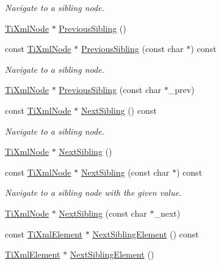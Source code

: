 \begin{DoxyCompactItemize}
\begin{DoxyCompactList}\small\item\em Navigate to a sibling node. \end{DoxyCompactList}\item 
\hyperlink{class_ti_xml_node}{Ti\+Xml\+Node} $\ast$ \hyperlink{class_ti_xml_node_af8c0642ad6ecc03f62953e68896ed1cc}{Previous\+Sibling} ()
\item 
const \hyperlink{class_ti_xml_node}{Ti\+Xml\+Node} $\ast$ \hyperlink{class_ti_xml_node_abbb3b8c1f38fa7b9e52d584a4aeca795}{Previous\+Sibling} (const char $\ast$) const 
\begin{DoxyCompactList}\small\item\em Navigate to a sibling node. \end{DoxyCompactList}\item 
\hyperlink{class_ti_xml_node}{Ti\+Xml\+Node} $\ast$ \hyperlink{class_ti_xml_node_a6c977049207177ef21b51972315c2053}{Previous\+Sibling} (const char $\ast$\+\_\+prev)
\item 
const \hyperlink{class_ti_xml_node}{Ti\+Xml\+Node} $\ast$ \hyperlink{class_ti_xml_node_af854baeba384f5fe9859f5aee03b548e}{Next\+Sibling} () const 
\begin{DoxyCompactList}\small\item\em Navigate to a sibling node. \end{DoxyCompactList}\item 
\hyperlink{class_ti_xml_node}{Ti\+Xml\+Node} $\ast$ \hyperlink{class_ti_xml_node_a4d05f7b1d7b470ac6887edd072d4892a}{Next\+Sibling} ()
\item 
const \hyperlink{class_ti_xml_node}{Ti\+Xml\+Node} $\ast$ \hyperlink{class_ti_xml_node_acaf9dc17531ac041f602f9ad579573ea}{Next\+Sibling} (const char $\ast$) const 
\begin{DoxyCompactList}\small\item\em Navigate to a sibling node with the given \textquotesingle{}value\textquotesingle{}. \end{DoxyCompactList}\item 
\hyperlink{class_ti_xml_node}{Ti\+Xml\+Node} $\ast$ \hyperlink{class_ti_xml_node_a4080bc5cc8a5c139e7cf308669e850fc}{Next\+Sibling} (const char $\ast$\+\_\+next)
\item 
const \hyperlink{class_ti_xml_element}{Ti\+Xml\+Element} $\ast$ \hyperlink{class_ti_xml_node_a7667217e269e0da01d1f82aee94d1a3d}{Next\+Sibling\+Element} () const 
\item 
\hyperlink{class_ti_xml_element}{Ti\+Xml\+Element} $\ast$ \hyperlink{class_ti_xml_node_a1b211cb5034655a04358e0e2f6fc5010}{Next\+Sibling\+Element} ()

\end{DoxyCompactItemize}
